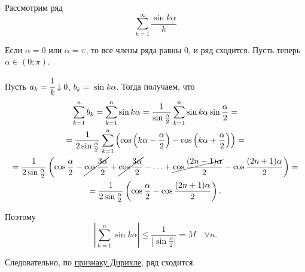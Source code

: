 \documentclass[../../main.tex]{subfiles}
\begin{document}
	\begin{example}
		Рассмотрим ряд
		\[\sum_{k = 1}^\infty\frac{\sin k\alpha}{k}\]
		
		Если $\alpha = 0$ или $\alpha = \pi$, то все члены ряда равны 0, 
		и ряд сходится. Пусть теперь $\alpha\in (0;\pi)$. 
		
		Пусть $a_k = \cfrac{1}{k}\downarrow 0$, $b_k = \sin k\alpha$. 
		Тогда получаем, что
		\begin{gather*}
			\sum_{k = 1}^n b_k = \sum_{k = 1}^n\sin k\alpha =
			\frac{1}{\sin\frac{\alpha}{2}}
			\sum_{k = 1}^n \sin k\alpha\sin\frac{\alpha}{2} = \\
			= \frac{1}{2\sin\frac{\alpha}{2}}
			\sum_{k = 1}^n\left(\cos\left(k\alpha - \frac{\alpha}{2}\right) - 
			\cos\left(k\alpha + \frac{\alpha}{2}\right)\right) = \\
			= \frac{1}{2\sin\frac{\alpha}{2}}\left(\cos\frac{\alpha}{2} - 
			\cancel{\cos\frac{3\alpha}{2}} + \cancel{\cos\frac{3\alpha}{2}} - 
			\ldots + \cancel{\cos\frac{(2n - 1)\alpha}{2}} - 
			\cos\frac{(2n + 1)\alpha}{2}\right) = \\
			= \frac{1}{2\sin\frac{\alpha}{2}}\left(\cos\frac{\alpha}{2} - 
			\cos\frac{(2n + 1)\alpha}{2}\right).
		\end{gather*}
		
		Поэтому
		\[\left|\sum_{k = 1}^n \sin k\alpha\right|\leq 
		\frac{1}{\left|\sin\frac{\alpha}{2}\right|} = M\quad \forall n.\]
		
		Следовательно, по \href{29:dirichle}{признаку Дирихле}, ряд сходится.
	\end{example}
\end{document}
